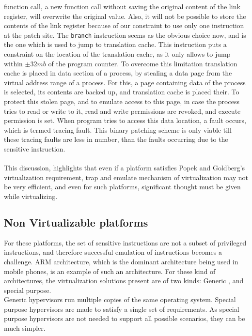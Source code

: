 \documentclass[seminar,twoside]{iitbreport}
\begin{document}
  function call, a new function call without saving the original content of the link register, will overwrite the original value. Also, it
  will not be possible to store the contents of the link register because of our constraint to use only one instruction at the patch site.
  The \texttt{branch} instruction seems as the obvious choice now, and is the one which is used to jump to translation cache. This instruction puts a constraint on the location
  of the translation cache, as it only allows to jump within $\pm 32mb$ of the program counter.
  To overcome this limitation translation cache is placed in data section of a process, by stealing a data page from the virtual address range of a process. For this, a page containing data of the process is selected,
  its contents are backed up, and translation cache is placed their. To protect this stolen page, and to emulate access to this page, in case the process tries to read or write to
  it, read and write permissions are revoked, and execute permission is set.
  When program tries to access this data location, a fault occurs, which is termed tracing fault. This binary patching scheme is only viable till these tracing
  faults are less in number, than the faults occurring due to the sensitive instruction.
  \\\\
  This discussion, highlights that even if a platform satisfies Popek and Goldberg's virtualization requirement, trap and emulate mechanism of virtualization
  may not be very efficient, and even for such platforms, significant thought must be given while virtualizing.
  
  \subsection{Non Virtualizable platforms}
  For these platforms, the set of sensitive instructions are not a subset of privileged instructions, and therefore successful emulation of instructions
  becomes a challenge. ARM architecture, which is the dominant architecture being used in mobile phones, is an example of such an architecture.
  For these kind of architectures, the virtualization solutions present are of two kinds: Generic , and special purpose.
  \\
  Generic hypervisors run multiple copies of the same operating system. Special purpose hypervisors are made to satisfy a single set of requirements. As special
  purpose hypervisors are not needed to support all possible scenarios, they can be much simpler.
  
\end{document}
